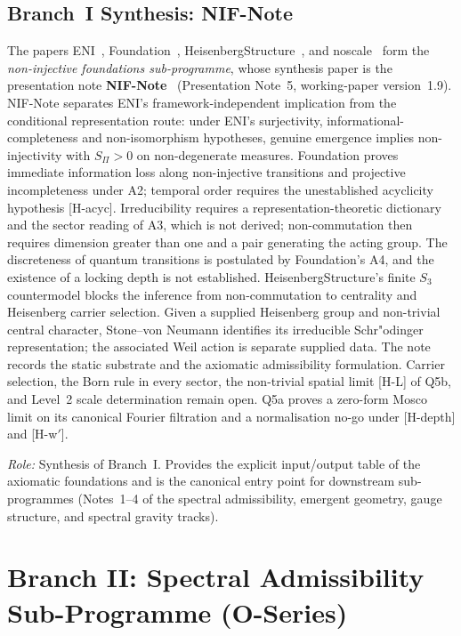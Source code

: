 \documentclass[11pt,a4paper]{article}
\begin{document}
  \subsection{Branch~I Synthesis: NIF-Note}
    \label{sec:nifnote}

    The papers ENI~\cite{Beau2026l}, Foundation~\cite{Beau2026m},
    HeisenbergStructure~\cite{Beau2026HeisenbergStructure}, and noscale~\cite{Beau2026j}
    form the \emph{non-injective foundations sub-programme}, whose synthesis paper is the
    presentation note \textbf{NIF-Note}~\cite{Beau2026ninote} (Presentation Note~5,
    working-paper version~1.9).
    NIF-Note separates ENI's framework-independent implication from the conditional representation route:
    under ENI's surjectivity, informational-completeness and non-isomorphism hypotheses, genuine emergence
    implies non-injectivity with $S_\Pi>0$ on non-degenerate measures.
    Foundation proves immediate information loss along non-injective transitions and projective incompleteness
    under A2; temporal order requires the unestablished acyclicity hypothesis [H-acyc].
    Irreducibility requires a representation-theoretic dictionary and the sector reading of A3, which is not
    derived; non-commutation then requires dimension greater than one and a pair generating the acting group.
    The discreteness of quantum transitions is postulated by Foundation's A4, and the existence of a locking
    depth is not established.
    HeisenbergStructure's finite $S_3$ countermodel blocks the inference from non-commutation to centrality
    and Heisenberg carrier selection.
    Given a supplied Heisenberg group and non-trivial central character, Stone--von Neumann identifies
    its irreducible Schr"odinger representation; the associated Weil action is separate supplied data.
    The note records the static substrate and the axiomatic admissibility formulation.
    Carrier selection, the Born rule in every sector, the non-trivial spatial limit [H-L] of Q5b,
    and Level~2 scale determination remain open.
    Q5a proves a zero-form Mosco limit on its canonical Fourier filtration and a normalisation no-go
    under [H-depth] and [H-w$'$].

    \textit{Role:} Synthesis of Branch~I. Provides the explicit input/output table of the
    axiomatic foundations and is the canonical entry point for downstream sub-programmes
    (Notes~1--4 of the spectral admissibility, emergent geometry, gauge structure, and spectral
    gravity tracks).

  \section{Branch II: Spectral Admissibility Sub-Programme (O-Series)}
  \label{sec:oseries}
\end{document}
